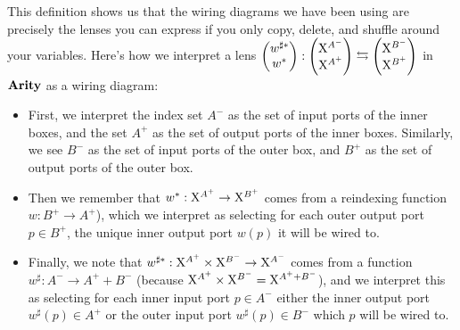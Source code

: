 \documentclass[DynamicalBook]{subfiles}
\begin{document}
This definition shows us that the wiring diagrams we have been using are
precisely the lenses you can express if you only copy, delete, and shuffle
around your variables. Here's how we interpret a lens
$\begin{pmatrix}{w^{\sharp\ast}} \\ {w^{\ast}} \end{pmatrix} : \begin{pmatrix}{\mathrm{X}^{A^{-}}} \\ {\mathrm{X}^{A^+}} \end{pmatrix}
\leftrightarrows \begin{pmatrix}{\mathrm{X}^{B^{-}}} \\ {\mathrm{X}^{B^+}} \end{pmatrix}$ in $\textbf{Arity}$ as a
wiring diagram:
\begin{itemize}
  \item First, we interpret the index set $A^-$ as the set of input ports of the
    inner boxes, and the set $A^+$ as the set of output ports of the inner
    boxes. Similarly, we see $B^-$ as the set of input ports of the outer box,
    and $B^+$ as the set of output ports of the outer box.
  \item Then we remember that $w^{\ast} :
    \mathrm{X}^{A^+} \to \mathrm{X}^{B^+}$ comes from a reindexing function $w : B^+ \to
    A^+$), which we interpret
    as selecting for each outer output port $p \in B^+$, the unique inner output
    port $w(p)$ it will be wired to.
  \item Finally, we note that $w^{\sharp\ast} : \mathrm{X}^{A^+} \times \mathrm{X}^{B^-} \to
    \mathrm{X}^{A^-}$ comes from a function $w^{\sharp} : A^- \to A^+ + B^-$ (because
    $\mathrm{X}^{A^+} \times \mathrm{X}^{B^-} = \mathrm{X}^{A^+ + B^-}$), and we interpret this as
    selecting for each inner input port $p \in A^-$ either the inner output port
    $w^{\sharp}(p) \in A^+$ or the outer input port
    $w^{\sharp}(p) \in B^-$ which $p$ will be wired to.
\end{itemize}
\end{document}
